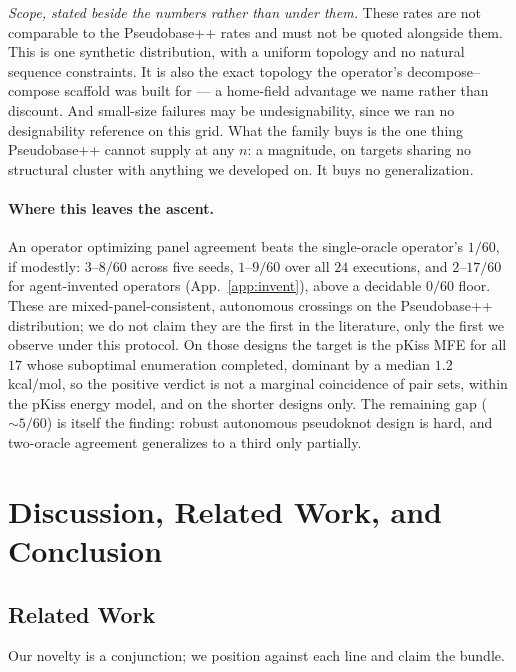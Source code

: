 \documentclass[11pt]{article}
\begin{document}
\emph{Scope, stated beside the numbers rather than under them.} These rates are not comparable to the
Pseudobase++ rates and must not be quoted alongside them. This is one synthetic distribution, with a uniform topology and no natural sequence constraints. It is also the
exact topology the operator's decompose--compose scaffold was built for --- a home-field advantage we name
rather than discount. And small-size failures may be undesignability, since we ran no designability reference on
this grid. What the family buys is the one thing
Pseudobase++ cannot supply at any $n$: a magnitude, on targets sharing no structural cluster with anything we
developed on. It buys no generalization.

\paragraph{Where this leaves the ascent.} An operator optimizing panel agreement beats the single-oracle operator's $1/60$, if
modestly: $3$--$8/60$ across five seeds, $1$--$9/60$ over all $24$ executions, and
$2$--$17/60$ for agent-invented operators (App.~\ref{app:invent}), above a decidable $0/60$ floor. These are
mixed-panel-consistent, autonomous crossings on the Pseudobase++ distribution; we do not claim they are the
first in the literature, only the first we observe under this protocol. On those designs the target is the
pKiss MFE for all $17$ whose suboptimal enumeration completed, dominant by a median $1.2$\,kcal/mol, so the
positive verdict is not a marginal coincidence of pair sets, within the pKiss energy model, and on the
shorter designs only. The remaining gap ($\sim\!5/60$) is itself the finding: robust autonomous pseudoknot
design is hard, and two-oracle agreement generalizes to a third only partially.

\section{Discussion, Related Work, and Conclusion}\label{sec:discussion}

\subsection{Related Work}\label{sec:related}
Our novelty is a conjunction; we position against each line and claim the bundle.
\end{document}

